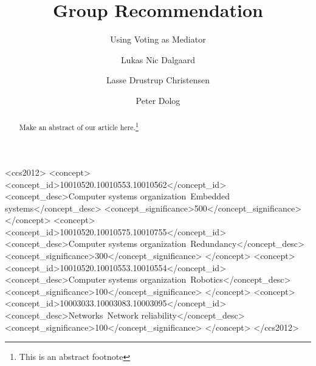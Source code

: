 \documentclass[sigconf]{acmart}
\begin{document}
\title{Group Recommendation}
\subtitle{Using Voting as Mediator}


\author{Lukas Nic Dalgaard}

\author{Lasse Drustrup Christensen}

\author{Peter Dolog}





\begin{abstract}
Make an abstract of our article here.\footnote{This is an abstract footnote}
\end{abstract}

%
%

\iffalse
\begin{CCSXML}
<ccs2012>
 <concept>
  <concept_id>10010520.10010553.10010562</concept_id>
  <concept_desc>Computer systems organization~Embedded systems</concept_desc>
  <concept_significance>500</concept_significance>
 </concept>
 <concept>
  <concept_id>10010520.10010575.10010755</concept_id>
  <concept_desc>Computer systems organization~Redundancy</concept_desc>
  <concept_significance>300</concept_significance>
 </concept>
 <concept>
  <concept_id>10010520.10010553.10010554</concept_id>
  <concept_desc>Computer systems organization~Robotics</concept_desc>
  <concept_significance>100</concept_significance>
 </concept>
 <concept>
  <concept_id>10003033.10003083.10003095</concept_id>
  <concept_desc>Networks~Network reliability</concept_desc>
  <concept_significance>100</concept_significance>
 </concept>
</ccs2012>  
\end{CCSXML}
\end{document}
